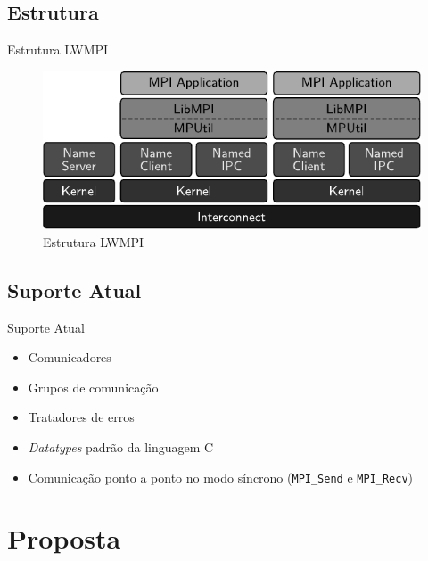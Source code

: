 \documentclass{beamer}
\begin{document}
  \subsection{Estrutura}
    \begin{frame}{Estrutura LWMPI}
      \begin{figure}
        \centering
        \includegraphics[width=0.9\linewidth]{images/libmpi.pdf}
        \caption{Estrutura LWMPI}
        \label{fig:lwmpi}
      \end{figure}
    \end{frame}

  \subsection{Suporte Atual}
    \begin{frame}{Suporte Atual}
      \begin{itemize}
        \item Comunicadores
        \item Grupos de comunicação
        \item Tratadores de erros
        \item \textit{Datatypes} padrão da linguagem C
        \item Comunicação ponto a ponto no modo síncrono (\texttt{MPI\_Send} e \texttt{MPI\_Recv})
      \end{itemize}
    \end{frame}


\section{Proposta}
\end{document}
